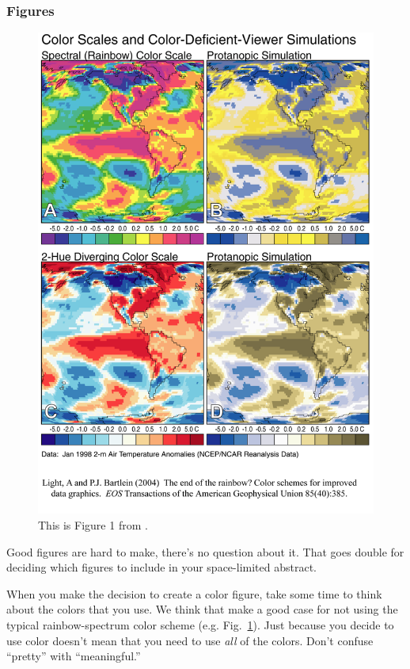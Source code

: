 \documentclass[twoside]{article}
\begin{document}
\subsubsection*{Figures}

\begin{figure}
\begin{center}
\includegraphics[width=\columnwidth]{lb_fig1.png}
\caption[Color Scales and Color-Deficient-Viewer Simulations]{
    \label{color_scales}
    This is Figure 1 from \citet{2004EOSTr..85..385L}.  
    }
\end{center}
\end{figure}

Good figures are hard to make, there's no question about it.  That
goes double for deciding which figures to include in your 
space-limited abstract.

When you make the decision to create a color figure, take some time
to think about the colors that you use.  We think that
\citet{2004EOSTr..85..385L} make a good case for not using the
typical rainbow-spectrum color scheme (e.g. Fig.~\ref{color_scales}).
Just because you decide to use color doesn't mean that you need to
use \emph{all} of the colors.  Don't confuse ``pretty'' with
``meaningful.''
\end{document}
